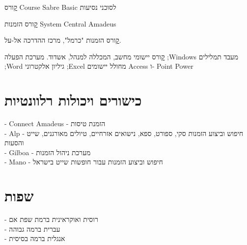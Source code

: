 {\href{https://raw.githubusercontent.com/kiril-u/k-resume-2021-1-template/main/references/basic-sabre-course.jpg}
	קורס Course Sabre Basic לסוכני נסיעות}
{}
{}

{\href{https://raw.githubusercontent.com/kiril-u/k-resume-2021-1-template/main/references/amadeus-central-system.jpg}
קורס הזמנות
System Central Amadeus
}
{}
{}

{\href{https://raw.githubusercontent.com/kiril-u/k-resume-2021-1-template/main/references/el-al-carmel.jpg}קורס הזמנות "כרמל", מרכז ההדרכה אל-על.}
{}
{}


 {
	\href{https://raw.githubusercontent.com/kiril-u/k-resume-2021-1-template/main/references/computer-programs-cert.jpg}
	קורס יישומי מחשב, המכללה למנהל, אשדוד.}
 {מערכת הפעלה ;Windows
 מעבד תמלילים ;Word
 גיליון אלקטרוני ;Excel מחולל יישומים 
 Access ו- Point Power}
{}
{}





\section{כישורים ויכולות רלוונטיות}
{- Connect Amadeus - הזמנת טיסות \\
	- Alp - חיפוש וביצוע הזמנות סקי, ספורט, ספא, נישואים אזרחיים, טיולים מאורגנים,   שייט והסעות
	\\
	- Gilboa - מערכת ניהול הזמנות \\
	- Mano - חיפוש וביצוע הזמנות עבור חופשות שייט בישראל}{}{}

\section{שפות}
{
- רוסית ואוקראינית ברמת שפת אם \\
- עברית ברמה גבוהה \\
- אנגלית ברמה בסיסית}
{}
{}



\unsetRTL
